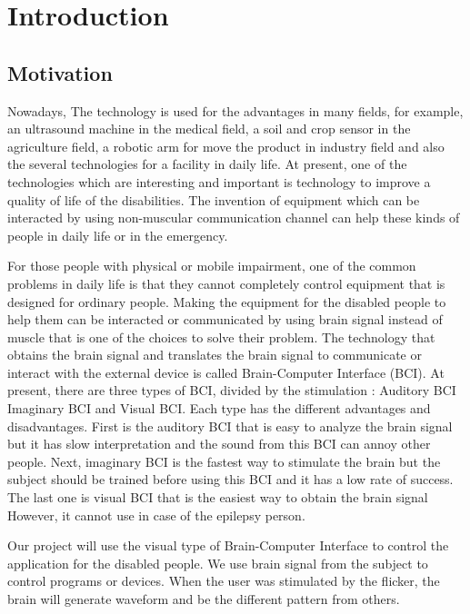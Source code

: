 \chapter{Introduction}

\setlength{\parindent}{4em}
\setlength{\parskip}{1em}
\renewcommand{\baselinestretch}{1.5}
\section{Motivation}

\hspace{1.5cm}Nowadays, The technology is used for the advantages in many fields, for example, an ultrasound machine in the medical field, a soil and crop sensor in the agriculture field, a robotic arm for move the product in industry field and also the several technologies for a facility in daily life. At present, one of the technologies which are interesting and important is technology to improve a quality of life of the disabilities. The invention of equipment which can be interacted by using non-muscular communication channel can help these kinds of people in daily life or in the emergency.\par
For those people with physical or mobile impairment, one of the common problems in daily life is that they cannot completely control equipment that is designed for ordinary people. Making the equipment for the disabled people to help them can be interacted or communicated by using brain signal instead of muscle that is one of the choices to solve their problem. The technology that obtains the brain signal and translates the brain signal to communicate or interact with the external device is called Brain-Computer Interface (BCI). At present, there are three types of BCI, divided by the stimulation : Auditory BCI Imaginary BCI and Visual BCI. Each type has the different advantages and disadvantages. First is the auditory BCI that is easy to analyze the brain signal but it has slow interpretation and the sound from this BCI can annoy other people. Next, imaginary BCI is the fastest way to stimulate the brain but the subject should be trained before using this BCI and it has a low rate of success. The last one is visual BCI that is the easiest way to obtain the brain signal However, it cannot use in case of the epilepsy person.\par
Our project will use the visual type of Brain-Computer Interface to control the application for the disabled people. We use brain signal from the subject to control programs or devices. When the user was stimulated by the flicker, the brain will generate waveform and be the different pattern from others.  

